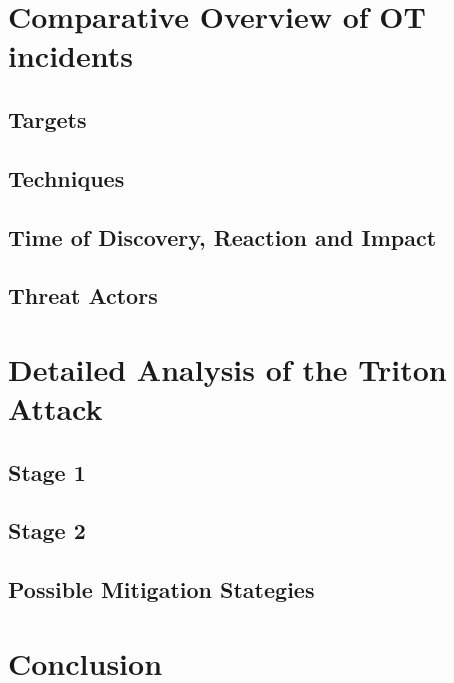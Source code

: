 \documentclass[runningheads]{llncs}
\begin{document}
\section{Comparative Overview of OT incidents}
\subsection{Targets}
\subsection{Techniques}
\subsection{Time of Discovery, Reaction and Impact}
\subsection{Threat Actors}
\section{Detailed Analysis of the Triton Attack}
\subsection{Stage 1}
\subsection{Stage 2}
\subsection{Possible Mitigation Stategies}
\section{Conclusion}
%
%
%


\end{document}
